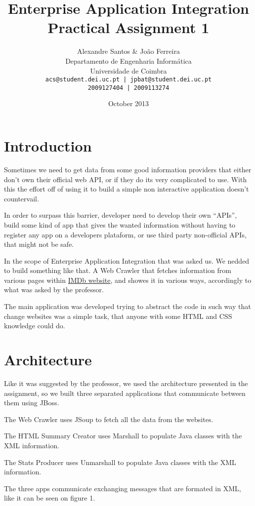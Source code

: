 \documentclass[a4paper]{article}
\title{Enterprise Application Integration \\ Practical Assignment 1}
\author{Alexandre Santos \& João Ferreira\\
		Departamento de Engenharia Informática\\
		Universidade de Coimbra\\
		\texttt{acs@student.dei.uc.pt | jpbat@student.dei.uc.pt}\\
		\texttt{2009127404 | 2009113274}}
\date{October 2013}
\begin{document}
\maketitle
\clearpage

\tableofcontents

\setlength{\parindent}{1cm}
\setlength{\parskip}{0.3cm}

\clearpage
\section{Introduction}
\indent \indent Sometimes we need to get data from some good information providers that either don't own their official web API, or if they do its very complicated to use. With this the effort off of using it to build a simple non interactive application doesn't countervail.

In order to surpass this barrier, developer need to develop their own ``APIs'', build some kind of app that gives the wanted information without having to register any app on a developers plataform, or use third party non-official APIs, that might not be safe.

In the scope of Enterprise Application Integration that was asked us. We nedded to build something like that. A Web Crawler that fetches information from various pages within \href{http://www.imdb.com}{IMDb website}, and showes it in various ways, accordingly to what was asked by the professor.

The main application was developed trying to abstract the code in such way that change websites was a simple task, that anyone with some HTML and CSS knowledge could do.

\clearpage
\section{Architecture}
\indent \indent Like it was suggested by the professor, we used the architecture presented in the assignment, so we built three separated applications that communicate between them using JBoss.

The Web Crawler uses JSoup to fetch all the data from the websites.

The HTML Summary Creator uses Marshall to populate Java classes with the XML information.

The Stats Producer uses Unmarshall to populate Java classes with the XML information.

The three apps communicate exchanging messages that are formated in XML, like it can be seen on figure 1.
\end{document}
